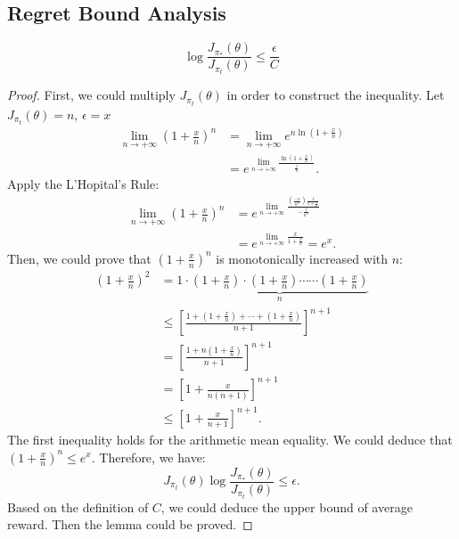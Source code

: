 \subsection{Regret Bound Analysis}

\begin{lemma}
$$
\log \frac{J_{\pi_{*}}(\theta)}{J_{\pi_{t}}(\theta)} \leq \frac{\epsilon}{C}
$$
\begin{proof}
First, we could multiply $J_{\pi_{t}}(\theta)$ in order to construct the inequality. Let $J_{\pi_{t}}(\theta) = n$, $\epsilon = x$
\begin{equation}
\begin{aligned}
\lim _{n \rightarrow+\infty}\left(1+\frac{x}{n}\right)^{n} &= \lim _{n \rightarrow+\infty} e^{n \ln \left(1+\frac{x}{n}\right)} \\
&=e^{\lim _{n \rightarrow+\infty} \frac{\ln \left(1+\frac{x}{n}\right)}{\frac{1}{n}}}.
\end{aligned}
\end{equation}
Apply the L'Hopital's Rule:
\begin{equation}
\begin{aligned}
\lim _{n \rightarrow+\infty}\left(1+\frac{x}{n}\right)^{n}&= e^{\lim _{n \rightarrow+\infty} \frac{\left(\frac{-x}{n^{2}}\right) \frac{1}{1+\frac{x}{n}}}{-\frac{1}{n^{2}}}}\\
&= e^{\lim _{n \rightarrow+\infty} \frac{x}{1+\frac{x}{n}}}=e^{x}.
\end{aligned}
\end{equation}
Then, we could prove that $\left(1+\frac{x}{n}\right)^{n}$ is monotonically increased with $n$:
\begin{equation}
\begin{aligned}
(1+\frac{x}{n})^{2} &= 1 \cdot\underbrace{ \left(1+\frac{x}{n}\right) \cdot\left(1+\frac{x}{n}\right) \cdots \cdots\left(1+\frac{x}{n}\right)}_{n}\\
& \leq \left[\frac{1+(1+\frac{x}{n})+ \cdots +(1+\frac{x}{n})}{n+1}\right]^{n+1}\\
& = \left[\frac{1+n(1+\frac{x}{n})}{n+1}\right]^{n+1}\\
& = \left[1+\frac{x}{n(n+1)}\right]^{n+1}\\
& \leq \left[1+\frac{x}{n+1}\right]^{n+1}.
\end{aligned}
\end{equation}
The first inequality holds for the arithmetic mean equality. We could deduce that $(1+\frac{x}{n})^{n} \leq e^{x}$. Therefore, we have:
\begin{equation}
J_{\pi_{t}}(\theta) \log \frac{J_{\pi_{*}}(\theta)}{J_{\pi_{t}}(\theta)} \leq \epsilon.
\end{equation}
Based on the definition of $C$, we could deduce the upper bound of average reward. Then the lemma could be proved.
\end{proof}
\end{lemma}



